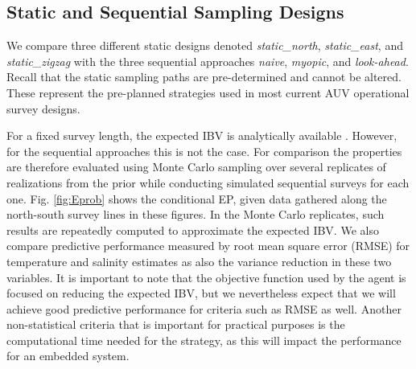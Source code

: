 \documentclass[aoas]{imsart}
\begin{document}
\subsection{Static and Sequential Sampling Designs}\label{sec:sampling_designs}


We compare three different static designs denoted
\textit{static\_north}, \textit{static\_east}, and
\textit{static\_zigzag} with the three sequential approaches
\textit{naive}, \textit{myopic}, and \textit{look-ahead}. Recall that
the static sampling paths are pre-determined and cannot be altered.
These represent the pre-planned strategies used in most current AUV
operational survey designs.

For a fixed survey length, the expected IBV is analytically available
. However, for the sequential approaches this is not the
case. For comparison the properties are therefore evaluated using
Monte Carlo sampling over several replicates of realizations from the
prior while conducting simulated sequential surveys for each
one. Fig. \ref{fig:Eprob} shows the conditional EP, given data
gathered along the north-south survey lines in these figures.  In the
Monte Carlo replicates, such results are repeatedly computed to
approximate the expected IBV. We also compare predictive performance
measured by root mean square error (RMSE) for temperature and salinity
estimates as also the variance reduction in these two variables. It is
important to note that the objective function used by the agent is
focused on reducing the expected IBV, but we nevertheless expect that
we will achieve good predictive performance for criteria such as RMSE
as well. Another non-statistical criteria that is important for
practical purposes is the computational time needed for the strategy,
as this will impact the performance for an embedded system.
\end{document}
